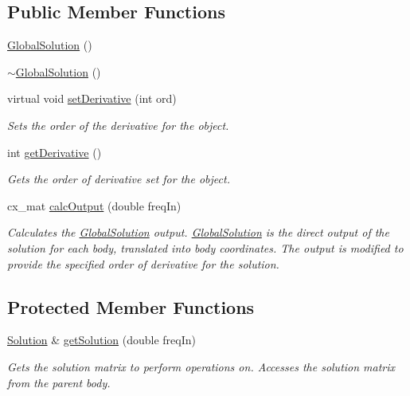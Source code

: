 \subsection*{Public Member Functions}
\begin{DoxyCompactItemize}
\item 
\hyperlink{class_global_solution_a27fcfb056c30fc07f8937bc71ec677e6}{Global\-Solution} ()
\item 
\hyperlink{class_global_solution_aea630b237ced06e04c5ea00bf1bb9398}{$\sim$\-Global\-Solution} ()
\item 
virtual void \hyperlink{class_global_solution_a537163391f1f55d073720b20f69acfa5}{set\-Derivative} (int ord)
\begin{DoxyCompactList}\small\item\em Sets the order of the derivative for the object. \end{DoxyCompactList}\item 
int \hyperlink{class_global_solution_abf8fa956895f2728820d65fda2f5304d}{get\-Derivative} ()
\begin{DoxyCompactList}\small\item\em Gets the order of derivative set for the object. \end{DoxyCompactList}\item 
cx\-\_\-mat \hyperlink{class_global_solution_adf90922a97153ce858da530e20bc3f4d}{calc\-Output} (double freq\-In)
\begin{DoxyCompactList}\small\item\em Calculates the \hyperlink{class_global_solution}{Global\-Solution} output. \hyperlink{class_global_solution}{Global\-Solution} is the direct output of the solution for each body, translated into body coordinates. The output is modified to provide the specified order of derivative for the solution. \end{DoxyCompactList}\end{DoxyCompactItemize}
\subsection*{Protected Member Functions}
\begin{DoxyCompactItemize}
\item 
\hyperlink{class_solution}{Solution} \& \hyperlink{class_global_solution_a43a8caad9f88e3b468c3e9a364b45500}{get\-Solution} (double freq\-In)
\begin{DoxyCompactList}\small\item\em Gets the solution matrix to perform operations on. Accesses the solution matrix from the parent body. \end{DoxyCompactList}\end{DoxyCompactItemize}
